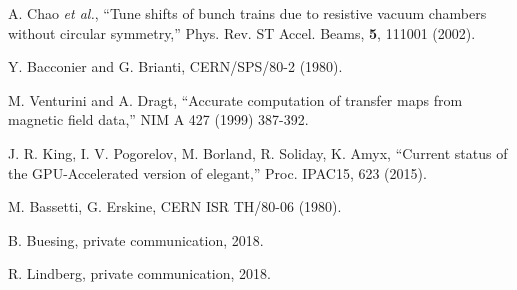 \documentclass[11pt]{article}
\begin{document}
\begin{thebibliography}{9}
  A. Chao {\em et al.}, ``Tune shifts of bunch trains due to resistive vacuum chambers without circular symmetry,''
  Phys. Rev. ST Accel. Beams, {\bf 5}, 111001 (2002).

Y. Bacconier and G. Brianti, CERN/SPS/80-2 (1980).

M. Venturini and A. Dragt, ``Accurate computation of transfer maps from magnetic field data,'' 
NIM A 427 (1999) 387-392.

J. R. King, I. V. Pogorelov, M. Borland, R. Soliday, K. Amyx,
``Current status of the GPU-Accelerated version of elegant,''
Proc. IPAC15, 623 (2015).

M. Bassetti, G. Erskine, CERN ISR TH/80-06 (1980).

B. Buesing, private communication, 2018.

R. Lindberg, private communication, 2018.

\end{thebibliography}
\end{document}
